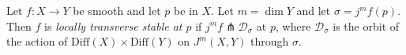 Let $f: X \to Y$ be smooth and let $p$ be in $X$. Let $m = \dim Y$ and let $\sigma = j^m f(p)$. Then $f$ is \textit{locally transverse stable at $p$} if $j^m f \pitchfork \mathcal{D}_\sigma$ at $p$, where $\mathcal{D}_\sigma$ is the orbit of the action of $\mathrm{Diff}(X) \times \mathrm{Diff}(Y)$ on $J^m(X, Y)$ through $\sigma$.
